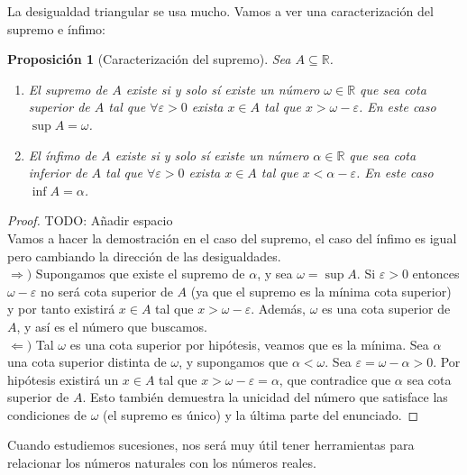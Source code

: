 \documentclass{article}
\newtheorem{prop}{Proposición}
\begin{document}
La desigualdad triangular se usa mucho. Vamos a ver una caracterización del supremo e ínfimo:
\begin{prop}[Caracterización del supremo]
Sea $A\subseteq \mathbb{R}$.
\begin{enumerate}
\item
El supremo de $A$ existe si y solo sí existe un número $\omega \in \mathbb{R}$ que sea cota superior de $A$ tal que $\forall \varepsilon > 0$ exista $x \in A$ tal que $x > \omega - \varepsilon$. En este caso $\sup A = \omega$.

\item
El ínfimo de $A$ existe si y solo sí existe un número $\alpha \in \mathbb{R}$ que sea cota inferior de $A$ tal que $\forall \varepsilon > 0$ exista $x \in A$ tal que $x < \alpha - \varepsilon$. En este caso $\inf A = \alpha$.
\end{enumerate}
\end{prop}

\begin{proof}
	TODO: Añadir espacio\\ 
	Vamos a hacer la demostración en el caso del supremo, el caso del ínfimo es igual pero cambiando la dirección de las desigualdades.\\ 
	$\Rightarrow)$ Supongamos que existe el supremo de $\alpha$, y sea $\omega = \sup A$. Si $\varepsilon > 0$ entonces $\omega - \varepsilon$ no será cota superior de $A$ (ya que el supremo es la mínima cota superior) y por tanto existirá $x \in A$ tal que $x > \omega - \varepsilon$. Además, $\omega$ es una cota superior de $A$, y así es el número que buscamos.\\ 
	$\Leftarrow)$ Tal $\omega$ es una cota superior por hipótesis, veamos que es la mínima. Sea $\alpha$ una cota superior distinta de $\omega$, y supongamos que $\alpha < \omega$. Sea $\varepsilon = \omega - \alpha > 0$. Por hipótesis existirá un $x \in A$ tal que $x > \omega - \varepsilon = \alpha$, que contradice que $\alpha$ sea cota superior de $A$. Esto también demuestra la unicidad del número que satisface las condiciones de $\omega$ (el supremo es único) y la última parte del enunciado.
\end{proof}

Cuando estudiemos sucesiones, nos será muy útil tener herramientas para relacionar los números naturales con los números reales.
\end{document}
